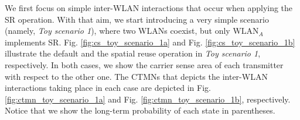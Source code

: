 \documentclass[comsoc]{IEEEtran}
\begin{document}
	We first focus on simple inter-WLAN interactions that occur when applying the SR operation. With that aim, we start introducing a very simple scenario (namely, \emph{Toy scenario 1}), where two WLANs coexist, but only $\text{WLAN}_A$ implements SR. Fig. \ref{fig:cs_toy_scenario_1a} and Fig. \ref{fig:cs_toy_scenario_1b} illustrate the default and the spatial reuse operation in \emph{Toy scenario 1}, respectively. In both cases, we show the carrier sense area of each transmitter with respect to the other one. The CTMNs that depicts the inter-WLAN interactions taking place in each case are depicted in Fig. \ref{fig:ctmn_toy_scenario_1a} and Fig. \ref{fig:ctmn_toy_scenario_1b}, respectively. Notice that we show the long-term probability of each state in parentheses.
	
	\begin{figure}[h!]
		\centering
		\\

\end{figure}
\end{document}
